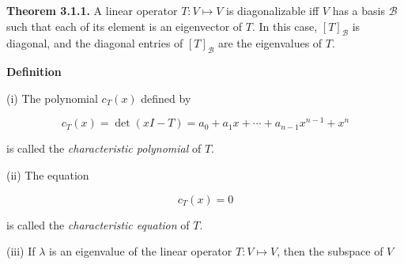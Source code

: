 \documentclass[10pt,landscape]{article}
\begin{document}
\begin{multicols}{4}







\textbf{Theorem 3.1.1.} A linear operator $T: V \mapsto V$ is diagonalizable iff $V$ has a basis $\mathcal{B}$ such that each of its element is an eigenvector of $T$. In this case, $[T]_{\mathcal{B}}$ is diagonal, and the diagonal entries of $[T]_{\mathcal{B}}$ are the eigenvalues of $T$.

\textbf{Definition}

(i) The polynomial $c_T(x)$ defined by 

$$
c_T(x) = \det (xI - T) = a_0 + a_1x + \cdots + a_{n-1}x^{n-1} + x^n
$$

is called the \textit{characteristic polynomial} of $T$.

(ii) The equation 

$$
c_T(x) = 0
$$

is called the \textit{characteristic equation} of $T$.

(iii) If $\lambda$ is an eigenvalue of the linear operator $T: V \mapsto V$, then the subspace of $V$


\end{multicols}
\end{document}
